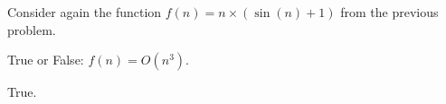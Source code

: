 \begin{prob}
    Consider again the function $f(n) = n \times ( \sin (n) + 1)$ from the previous
    problem.

    True or False: $f(n) = O(n^3)$.

    \Tf{}

    \begin{soln}
        True.
    \end{soln}

\end{prob}
